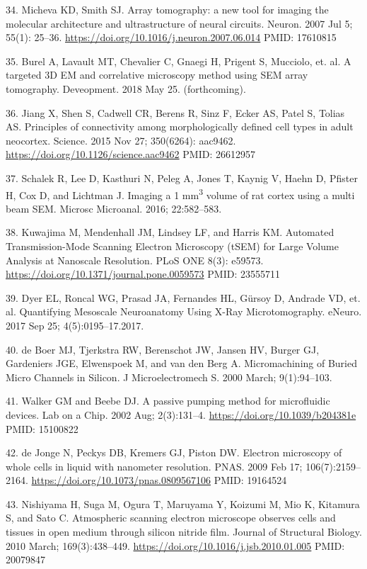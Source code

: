 \documentclass{article}
\begin{document}
\begin{hangpars}
34. Micheva KD, Smith SJ. Array tomography: a new tool for imaging the molecular architecture and ultrastructure of neural circuits. Neuron. 2007 Jul 5; 55(1): 25–36. \url{https://doi.org/10.1016/j.neuron.2007.06.014} PMID: 17610815

35. Burel A, Lavault MT, Chevalier C, Gnaegi H, Prigent S, Mucciolo, et. al. A targeted 3D EM and correlative microscopy method using SEM array tomography. Deveopment. 2018 May 25. (forthcoming).

36. Jiang X, Shen S, Cadwell CR, Berens R, Sinz F, Ecker AS, Patel S, Tolias AS. Principles of connectivity among morphologically defined cell types in adult neocortex. Science. 2015 Nov 27; 350(6264): aac9462. \url{https://doi.org/10.1126/science.aac9462} PMID: 26612957

37. Schalek R, Lee D, Kasthuri N, Peleg A, Jones T, Kaynig V, Haehn D, Pfister H, Cox D, and Lichtman J. Imaging a 1 mm\textsuperscript{3} volume of rat cortex using a multi beam SEM. Microsc Microanal. 2016; 22:582–583.

38. Kuwajima M, Mendenhall JM, Lindsey LF, and Harris KM. Automated Transmission-Mode Scanning Electron Microscopy (tSEM) for Large Volume Analysis at Nanoscale Resolution. PLoS ONE 8(3): e59573. \url{https://doi.org/10.1371/journal.pone.0059573} PMID: 23555711

39. Dyer EL, Roncal WG, Prasad JA, Fernandes HL, Gürsoy D, Andrade VD, et. al. Quantifying Mesoscale Neuroanatomy Using X-Ray Microtomography. eNeuro. 2017 Sep 25; 4(5):0195–17.2017.

40. de Boer MJ, Tjerkstra RW, Berenschot JW, Jansen HV, Burger GJ, Gardeniers JGE, Elwenspoek M, and van den Berg A. Micromachining of Buried Micro Channels in Silicon. J Microelectromech S. 2000 March; 9(1):94–103.

41. Walker GM and Beebe DJ. A passive pumping method for microfluidic devices. Lab on a Chip. 2002 Aug; 2(3):131–4. \url{https://doi.org/10.1039/b204381e} PMID: 15100822

42. de Jonge N, Peckys DB, Kremers GJ, Piston DW. Electron microscopy of whole cells in liquid with nanometer resolution. PNAS. 2009 Feb 17; 106(7):2159–2164. \url{https://doi.org/10.1073/pnas.0809567106} PMID: 19164524

43. Nishiyama H, Suga M, Ogura T, Maruyama Y, Koizumi M, Mio K, Kitamura S, and Sato C. Atmospheric scanning electron microscope observes cells and tissues in open medium through silicon nitride film. Journal of Structural Biology. 2010 March; 169(3):438–449. \url{https://doi.org/10.1016/j.jsb.2010.01.005} PMID: 20079847
\end{hangpars}
\end{document}
